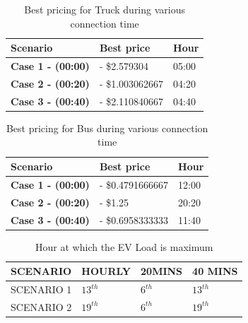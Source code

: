 		\begin{table}[h]
			\centering
			\begin{tabular}{|l|l|l|}
				\hline
				\textbf{Scenario}         & \textbf{Best price} & \textbf{Hour} \\ \hline
				\textbf{Case 1 - (00:00)}  & - \$2.579304 & 05:00         \\ \hline
				\textbf{Case 2 - (00:20)} & - \$1.003062667 & 04:20         \\ \hline
				\textbf{Case 3 - (00:40)} & - \$2.110840667 & 04:40         \\ \hline
			\end{tabular}
			\caption{Best pricing for Truck during various connection time}
		\end{table}



		\begin{table}[h]
			\centering
			\begin{tabular}{|l|l|l|}
				\hline
				\textbf{Scenario}         & \textbf{Best price} & \textbf{Hour} \\ \hline
				\textbf{Case 1 - (00:00)}  & - \$0.4791666667   & 12:00         \\ \hline
				\textbf{Case 2 - (00:20)} & - \$1.25         & 20:20         \\ \hline
				\textbf{Case 3 - (00:40)} & - \$0.6958333333 & 11:40         \\ \hline
			\end{tabular}
			\caption{Best pricing for Bus during various connection time}
		\end{table}

	\begin{table}[h]
		\centering
		\begin{tabular}{|ll|ll|ll|ll|}
			\hline
			\multicolumn{2}{|l|}{\textbf{SCENARIO}} & \multicolumn{2}{l|}{\textbf{HOURLY}} & \multicolumn{2}{l|}{\textbf{20MINS}} & \multicolumn{2}{l|}{\textbf{40 MINS}} \\ \hline
			\multicolumn{2}{|l|}{SCENARIO 1}        & \multicolumn{2}{l|}{$ 13^{th} $}            & \multicolumn{2}{l|}{$ 6^{th} $}             & \multicolumn{2}{l|}{$ 13^{th} $}             \\ \hline
			\multicolumn{2}{|l|}{SCENARIO 2}        & \multicolumn{2}{l|}{$ 19^{th} $}           & \multicolumn{2}{l|}{$ 6^{th} $}             & \multicolumn{2}{l|}{$ 19^{th} $}             \\ \hline
		\end{tabular}
		\caption{Hour at which the EV Load is maximum }
	\end{table}
		

